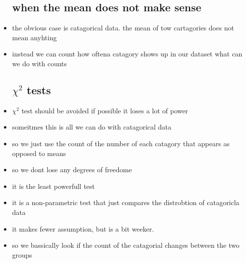 \documentclass{article}
\begin{document}
\begin{itemize}
\subsection{when the mean does not make sense}
\item the obvious case is catagorical data. the mean of tow cartagories does not mean anyhting 
\item instead we can count how oftena  catagory shows up in our dataset what can we do with counts
\subsection{$\chi^2$ tests}
\item$\chi^2$ test should be avoided if possible it loses a lot of power
\item someitmes this is all we can do with catagorical data
\item so we just use the count of the number of each catagory that appears as opposed to means
\item so we dont lose any degrees of freedome 
\item it is the least powerfull test
\item it is a non-parametric test that just compares the distrobtion of catagoricla data 
\item it makes fewer assumption, but is a bit weeker. 
\item so we bassically look if the count of the catagorial changes between the two groups

\end{itemize}
\end{document}
